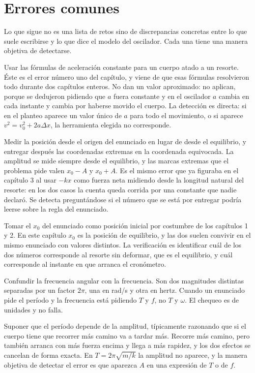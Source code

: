 \documentclass[11pt,openany]{book}
\begin{document}
\section{Errores comunes}

Lo que sigue no es una lista de retos sino de discrepancias concretas entre lo que suele escribirse y lo que dice el modelo del oscilador. Cada una tiene una manera objetiva de detectarse.

\begin{erroresComunes}
  \item Usar las fórmulas de aceleración constante para un cuerpo atado a un resorte. Éste es el error número uno del capítulo, y viene de que esas fórmulas resolvieron todo durante dos capítulos enteros. No dan un valor aproximado: no aplican, porque se dedujeron pidiendo que $a$ fuera constante y en el oscilador $a$ cambia en cada instante y cambia por haberse movido el cuerpo. La detección es directa: si en el planteo aparece un valor único de $a$ para todo el movimiento, o si aparece $v^2 = v_0^2 + 2a\Delta x$, la herramienta elegida no corresponde.
  \item Medir la posición desde el origen del enunciado en lugar de desde el equilibrio, y entregar después las coordenadas extremas en la coordenada equivocada. La amplitud se mide siempre desde el equilibrio, y las marcas extremas que el problema pide valen $x_0 - A$ y $x_0 + A$. Es el mismo error que ya figuraba en el capítulo 3 al usar $-kx$ como fuerza neta midiendo desde la longitud natural del resorte: en los dos casos la cuenta queda corrida por una constante que nadie declaró. Se detecta preguntándose si el número que se está por entregar podría leerse sobre la regla del enunciado.
  \item Tomar el $x_0$ del enunciado como posición inicial por costumbre de los capítulos 1 y 2. En este capítulo $x_0$ es la posición de equilibrio, y las dos suelen convivir en el mismo enunciado con valores distintos. La verificación es identificar cuál de los dos números corresponde al resorte sin deformar, que es el equilibrio, y cuál corresponde al instante en que arranca el cronómetro.
  \item Confundir la frecuencia angular con la frecuencia. Son dos magnitudes distintas separadas por un factor $2\pi$, una en rad/s y otra en hertz. Cuando un enunciado pide el período y la frecuencia está pidiendo $T$ y $f$, no $T$ y $\omega$. El chequeo es de unidades y no falla.
  \item Suponer que el período depende de la amplitud, típicamente razonando que si el cuerpo tiene que recorrer más camino va a tardar más. Recorre más camino, pero también arranca con más fuerza encima y llega a más rapidez, y los dos efectos se cancelan de forma exacta. En $T = 2\pi\sqrt{m/k}$ la amplitud no aparece, y la manera objetiva de detectar el error es que aparezca $A$ en una expresión de $T$ o de $f$.

\end{erroresComunes}
\end{document}
